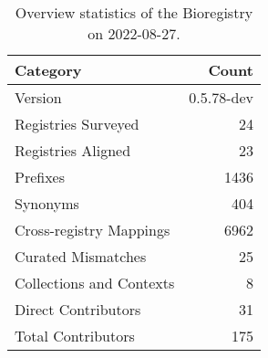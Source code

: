 \begin{table}
\centering
\caption{Overview statistics of the Bioregistry on 2022-08-27.}
\label{tab:bioregistry-summary}
\begin{tabular}{lr}
\toprule
                Category &      Count \\
\midrule
                 Version & 0.5.78-dev \\
     Registries Surveyed &         24 \\
      Registries Aligned &         23 \\
                Prefixes &       1436 \\
                Synonyms &        404 \\
 Cross-registry Mappings &       6962 \\
      Curated Mismatches &         25 \\
Collections and Contexts &          8 \\
     Direct Contributors &         31 \\
      Total Contributors &        175 \\
\bottomrule
\end{tabular}
\end{table}
